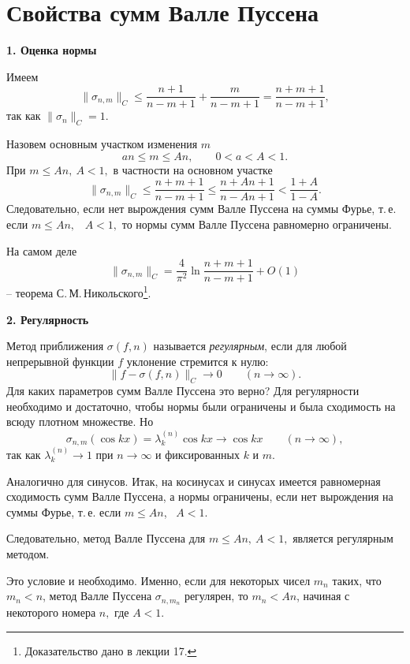 {\newpage

\section{Свойства сумм Валле Пуссена}

{\bf 1. Оценка нормы}
\vspace{3mm}

Имеем
$$
\|\sigma_{n,m}\|_C\le \frac{n+1}{n-m+1}+\frac{m}{n-m+1}=
\frac{n+m+1}{n-m+1},
$$
так как $\|\sigma_{n}\|_C=1.$

Назовем основным участком изменения $m$
$$
an\le m\le An,\qquad 0<a<A<1.
$$
При $m\le An,\ A<1,$ в частности на основном участке
$$
\|\sigma_{n,m}\|_C\le \frac{n+m+1}{n-m+1}
\le \frac{n+An+1}{n-An+1}
<
\frac{1+A}{1-A}.
$$
Следовательно, если нет вырождения сумм Валле Пуссена на суммы Фурье, т.\,е.
если $m\le An,$~ $A<1,$ то нормы сумм Валле Пуссена равномерно
ограничены.

\begin{Remark}
На самом деле
$$
\|\sigma_{n,m}\|_C=\frac{4}{\pi^2} \ln \frac{n+m+1}{n-m+1}+O(1)
$$
-- теорема С.\,М.\,Никольского\footnote{Доказательство дано в лекции 17.}.
\end{Remark}

\vspace{3mm}
{\bf 2. Регулярность}
\vspace{3mm}

Метод приближения $\sigma(f,n)$ называется \textit{регулярным}, если для
любой непрерывной функции $f$ уклонение стремится к нулю:
$$
\|f-\sigma(f,n)\|_C \to 0\qquad (n\to \infty).
$$
Для каких параметров сумм Валле Пуссена это верно?  Для
регулярности необходимо и достаточно, чтобы нормы были
ограничены и была сходимость на всюду плотном множестве. Но
$$
\sigma_{n,m}(\cos kx)=\lambda_k^{(n)}\cos kx \to \cos kx \qquad (n\to \infty),
$$
так как $\lambda_k^{(n)} \to 1$ при $n\to \infty$ и фиксированных $k$ и $m$.

Аналогично для синусов. Итак, на косинусах и синусах имеется равномерная сходимость
сумм Валле Пуссена, а нормы ограничены, если нет вырождения
на суммы Фурье, т.\,е. если $m\le An$,~ $A<1$.

Следовательно, метод Валле Пуссена для $m\le An,~ A<1,$ является регулярным методом.

\begin{Remark}
Это условие и необходимо. Именно, если для некоторых чисел $m_n$ таких, что
$m_n<n$, метод Валле Пуссена $\sigma_{n,m_n}$ регулярен,
то $m_n<An$, начиная с некоторого номера $n,$ где $A<1$.
\end{Remark}

}
